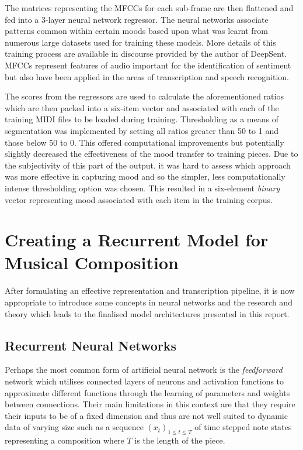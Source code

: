 \documentclass[12pt,]{article}
\begin{document}
The matrices representing the MFCCs for each sub-frame are then
flattened and fed into a 3-layer neural network regressor. The neural
networks associate patterns common within certain moods based upon what
was learnt from numerous large datasets used for training these models.
More details of this training process are available in discourse
provided by the author of DeepSent. MFCCs represent features of audio
important for the identification of sentiment but also have been applied
in the areas of transcription and speech recognition.

The scores from the regressors are used to calculate the aforementioned
ratios which are then packed into a six-item vector and associated with
each of the training MIDI files to be loaded during training.
Thresholding as a means of segmentation was implemented by setting all
ratios greater than 50 to 1 and those below 50 to 0. This offered
computational improvements but potentially slightly decreased the
effectiveness of the mood transfer to training pieces. Due to the
subjectivity of this part of the output, it was hard to assess which
approach was more effective in capturing mood and so the simpler, less
computationally intense thresholding option was chosen. This resulted in
a six-element \emph{binary} vector representing mood associated with
each item in the training corpus.

\hypertarget{creating-a-recurrent-model-for-musical-composition}{%
\section{Creating a Recurrent Model for Musical
Composition}\label{creating-a-recurrent-model-for-musical-composition}}

After formulating an effective representation and transcription
pipeline, it is now appropriate to introduce some concepts in neural
networks and the research and theory which leads to the finalised model
architectures presented in this report.

\hypertarget{recurrent-neural-networks}{%
\subsection{Recurrent Neural Networks}\label{recurrent-neural-networks}}

Perhaps the most common form of artificial neural network is the
\emph{feedforward} network which utilises connected layers of neurons
and activation functions to approximate different functions through the
learning of parameters and weights between connections. Their main
limitations in this context are that they require their inputs to be of
a fixed dimension and thus are not well suited to dynamic data of
varying size such as a sequence \((x_t)_{1\le t\le T}\) of time stepped
note states representing a composition where \(T\) is the length of the
piece.
\end{document}

